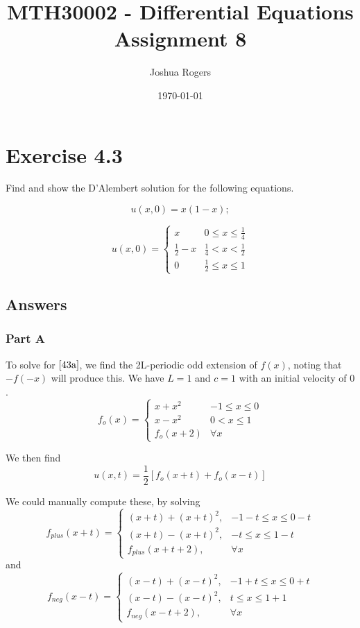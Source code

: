 \documentclass{article}
\title{\vspace{-4cm}MTH30002 - Differential Equations Assignment 8}
\author{Joshua Rogers}
\date\today
\begin{document}
\maketitle

\section*{Exercise 4.3}

Find and show the D'Alembert solution for the following equations.

\begin{equation}\label{43a}
u(x,0) = x(1-x);
\end{equation}

\begin{equation}\label{43b}
u(x,0) = \begin{cases}
x & 0 \leq x \leq \frac{1}{4} \\
\frac{1}{2} - x & \frac{1}{4} < x < \frac{1}{2} \\
0 & \frac{1}{2} \leq x \leq 1
   \end{cases}
\end{equation}

\subsection*{Answers}
\subsubsection*{Part A}

To solve for $\eqref{43a}$, we find the 2L-periodic odd extension of $f(x)$, noting that $-f(-x)$ will produce this. We have $L=1$ and $c=1$ with an initial velocity of $0$.
$$
f_o (x) = \begin{cases}
x+x^2 & -1 \leq x \leq 0 \\
x-x^2  & 0 < x \leq 1 \\
f_o (x+2) & \forall x
   \end{cases}
$$


We then find
$$
u(x,t) = \frac{1}{2} \left[ f_o(x+t)+f_o(x-t)\right]
$$

We could manually compute these, by solving
$$
f_{plus}(x+t) =
\begin{cases}
(x+t)+(x+t)^2, & -1-t \leq x \leq 0-t \\
(x+t)-(x+t)^2, & -t \leq x \leq 1-t \\
f_{plus}(x+t+2), & \forall x
   \end{cases}
$$
and
$$
f_{neg}(x-t) =
\begin{cases}
(x-t)+(x-t)^2, & -1 +t \leq x \leq 0+t \\
(x-t)-(x-t)^2, & t \leq x \leq 1+1 \\
f_{neg}(x-t+2), & \forall x
   \end{cases}
$$
\end{document}
